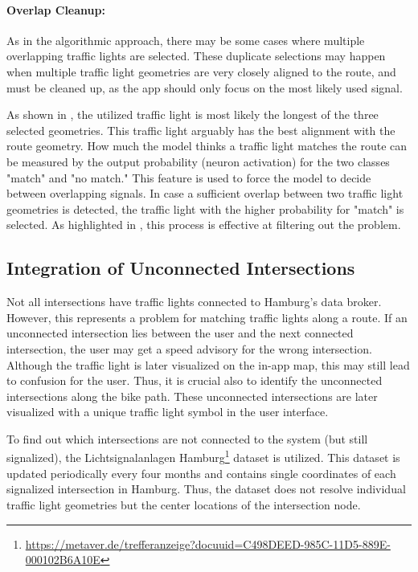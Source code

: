 \paragraph{Overlap Cleanup:} As in the algorithmic approach, there may be some cases where multiple overlapping traffic lights are selected. These duplicate selections may happen when multiple traffic light geometries are very closely aligned to the route, and must be cleaned up, as the app should only focus on the most likely used signal. 

As shown in , the utilized traffic light is most likely the longest of the three selected geometries. This traffic light arguably has the best alignment with the route geometry. How much the model thinks a traffic light matches the route can be measured by the output probability (neuron activation) for the two classes "match" and "no match." This feature is used to force the model to decide between overlapping signals. In case a sufficient overlap between two traffic light geometries is detected, the traffic light with the higher probability for "match" is selected. As highlighted in , this process is effective at filtering out the problem.

\subsection{Integration of Unconnected Intersections}

Not all intersections have traffic lights connected to Hamburg's data broker. However, this represents a problem for matching traffic lights along a route. If an unconnected intersection lies between the user and the next connected intersection, the user may get a speed advisory for the wrong intersection. Although the traffic light is later visualized on the in-app map, this may still lead to confusion for the user. Thus, it is crucial also to identify the unconnected intersections along the bike path. These unconnected intersections are later visualized with a unique traffic light symbol in the user interface.

To find out which intersections are not connected to the system (but still signalized), the Lichtsignalanlagen Hamburg\footnote{\url{https://metaver.de/trefferanzeige?docuuid=C498DEED-985C-11D5-889E-000102B6A10E}} dataset is utilized. This dataset is updated periodically every four months and contains single coordinates of each signalized intersection in Hamburg. Thus, the dataset does not resolve individual traffic light geometries but the center locations of the intersection node. 

